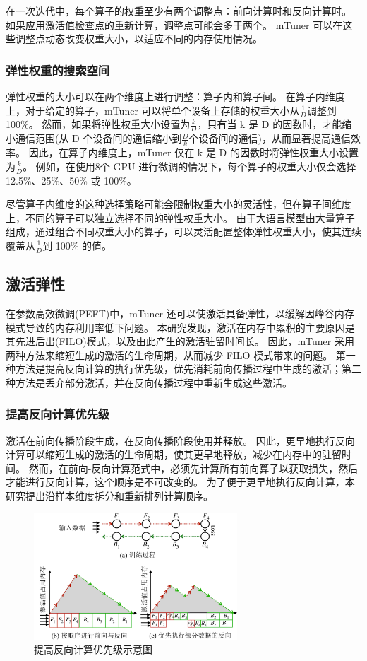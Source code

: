在一次迭代中，每个算子的权重至少有两个调整点：前向计算时和反向计算时。
如果应用激活值检查点的重新计算，调整点可能会多于两个。
mTuner 可以在这些调整点动态改变权重大小，以适应不同的内存使用情况。

\subsubsection{弹性权重的搜索空间}

弹性权重的大小可以在两个维度上进行调整：算子内和算子间。
在算子内维度上，对于给定的算子，mTuner 可以将单个设备上存储的权重大小从\(\frac{1}{D}\)调整到 100\%。
然而，如果将弹性权重大小设置为\(\frac{k}{D}\)，只有当 k 是 D 的因数时，才能缩小通信范围(从 D 个设备间的通信缩小到\(\frac{D}{k}\)个设备间的通信)，从而显著提高通信效率。
因此，在算子内维度上，mTuner 仅在 k 是 D 的因数时将弹性权重大小设置为\(\frac{k}{D}\)。
例如，在使用8个 GPU 进行微调的情况下，每个算子的权重大小仅会选择 12.5\%、25\%、50\% 或 100\%。

尽管算子内维度的这种选择策略可能会限制权重大小的灵活性，但在算子间维度上，不同的算子可以独立选择不同的弹性权重大小。
由于大语言模型由大量算子组成，通过组合不同权重大小的算子，可以灵活配置整体弹性权重大小，使其连续覆盖从\(\frac{1}{D}\)到 100\% 的值。

\subsection{激活弹性}
在参数高效微调(PEFT)中，mTuner 还可以使激活具备弹性，以缓解因峰谷内存模式导致的内存利用率低下问题。
本研究发现，激活在内存中累积的主要原因是其先进后出(FILO)模式，以及由此产生的激活驻留时间长。
因此，mTuner 采用两种方法来缩短生成的激活的生命周期，从而减少 FILO 模式带来的问题。
第一种方法是提高反向计算的执行优先级，优先消耗前向传播过程中生成的激活；第二种方法是丢弃部分激活，并在反向传播过程中重新生成这些激活。

\subsubsection{提高反向计算优先级}
激活在前向传播阶段生成，在反向传播阶段使用并释放。
因此，更早地执行反向计算可以缩短生成的激活的生命周期，使其更早地释放，减少在内存中的驻留时间。
然而，在前向-反向计算范式中，必须先计算所有前向算子以获取损失，然后才能进行反向计算，这个顺序是不可改变的。
为了便于更早地执行反向计算，本研究提出沿样本维度拆分和重新排列计算顺序。

\begin{figure}[ht]
\centerline{\includegraphics[width=0.68\textwidth]{figures/mtuner/backward-prior-crop.pdf}}
\caption{提高反向计算优先级示意图}
\label{fig:backward-prior}
\end{figure}

